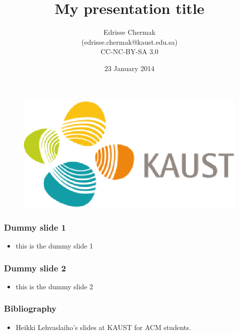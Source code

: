 \documentclass[c,2pt]{beamer}
\title[My presentation Title]{My presentation title}
\author[Edrisse Chermak] {Edrisse Chermak \\ (edrisse.chermak@kaust.edu.sa) \\ CC-NC-BY-SA 3.0}
\institute{KAUST}
\date[23 January 2014] {23 January 2014}
\begin{document}
\begin{frame}
  \titlepage
\begin{figure}
    \includegraphics[scale=0.25]{KAUST_Logo.eps}
\end{figure}
\end{frame}

\begin{frame}  \frametitle{Dummy slide 1}
\begin{itemize}
    \item   this is the dummy slide 1
\end{itemize}
\end{frame}

\begin{frame}  \frametitle{Dummy slide 2}
\begin{itemize}
    \item   this is the dummy slide 2
\end{itemize}
\end{frame}

\begin{frame}  \frametitle{Bibliography}
    \begin{itemize}
        \item Heikki Lehvaslaiho's slides at KAUST for ACM students.
    \end{itemize}
\end{frame}
\end{document}
